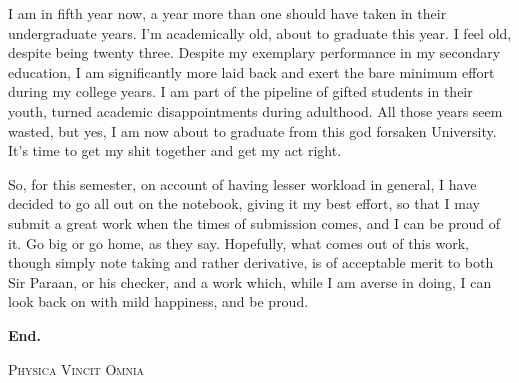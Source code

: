 I am in fifth year now, a year more than one should have taken in their undergraduate
years. I'm academically old, about to graduate this year. I feel old, despite being 
twenty three. Despite my exemplary 
performance in my secondary education, I am significantly more laid back and 
exert the bare minimum effort during my college years. I am part of the pipeline 
of gifted students in their youth, turned academic disappointments during adulthood.
All those years seem wasted, but yes, I am now about to graduate from this god forsaken
University. It's time to get my shit together and get my act right.

So, for this semester, on account of having lesser workload in general, 
I have decided to go all out on the notebook, giving it my best effort, so that 
I may submit a great work when the times of submission comes, and I can be proud of it. 
Go big or go home, as they say.
Hopefully, what comes out of this work, though simply note taking and rather derivative, is of acceptable merit 
to both Sir Paraan, or his checker, and a work which, while I am averse in doing, I can 
look back on with mild happiness, and be proud.
\vfill
\begin{flushright}
    {\Large \textbf{End.}}
\end{flushright}
\begin{center}
	{\large
		\textsc{Physica Vincit Omnia}
	}
\end{center}
